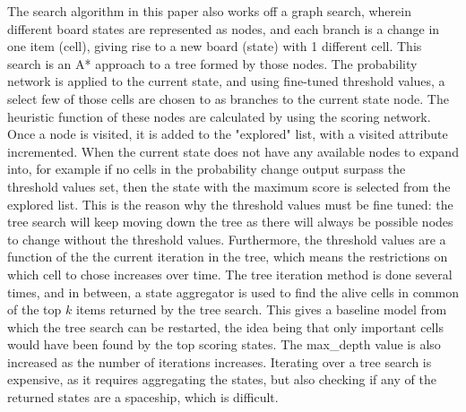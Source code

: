\documentclass{l4proj}
\begin{document}
The search algorithm in this paper also works off a graph search, wherein different board states are represented as nodes, and each branch is a change in one item (cell), giving rise to a new board (state) with 1 different cell. This search is an A* approach to a tree formed by those nodes. The probability network is applied to the current state, and using fine-tuned threshold values, a select few of those cells are chosen to as branches to the current state node. The heuristic function of these nodes are calculated by using the scoring network. Once a node is visited, it is added to the "explored" list, with a visited attribute incremented. When the current state does not have any available nodes to expand into, for example if no cells in the probability change output surpass the threshold values set, then the state with the maximum score is selected from the explored list. This is the reason why the threshold values must be fine tuned: the tree search will keep moving down the tree as there will always be possible nodes to change without the threshold values. Furthermore, the threshold values are a function of the the current iteration in the tree, which means the restrictions on which cell to chose increases over time. The tree iteration method is done several times, and in between, a state aggregator is used to find the alive cells in common of the top $k$ items returned by the tree search. This gives a baseline model from which the tree search can be restarted, the idea being that only important cells would have been found by the top scoring states. The max\_depth value is also increased as the number of iterations increases. Iterating over a tree search is expensive, as it requires aggregating the states, but also checking if any of the returned states are a spaceship, which is difficult.
\end{document}
